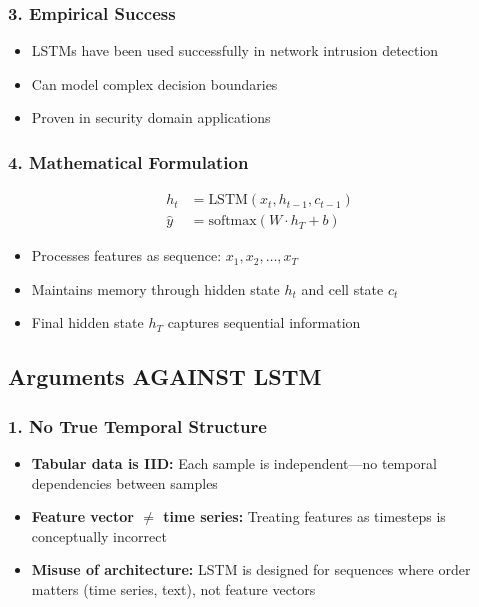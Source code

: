 \documentclass[12pt]{article}
\begin{document}
\subsubsection{3. Empirical Success}
\begin{itemize}
    \item LSTMs have been used successfully in network intrusion detection
    \item Can model complex decision boundaries
    \item Proven in security domain applications
\end{itemize}

\subsubsection{4. Mathematical Formulation}
\[
\begin{aligned}
h_t &= \text{LSTM}(x_t, h_{t-1}, c_{t-1}) \\
\hat{y} &= \text{softmax}(W \cdot h_T + b)
\end{aligned}
\]
\begin{itemize}
    \item Processes features as sequence: $x_1, x_2, \ldots, x_T$
    \item Maintains memory through hidden state $h_t$ and cell state $c_t$
    \item Final hidden state $h_T$ captures sequential information
\end{itemize}

\subsection{Arguments AGAINST LSTM}

\subsubsection{1. No True Temporal Structure}
\begin{itemize}
    \item \textbf{Tabular data is IID:} Each sample is independent—no temporal dependencies between samples
    \item \textbf{Feature vector $\neq$ time series:} Treating features as timesteps is conceptually incorrect
    \item \textbf{Misuse of architecture:} LSTM is designed for sequences where order matters (time series, text), not feature vectors
\end{itemize}
\end{document}
